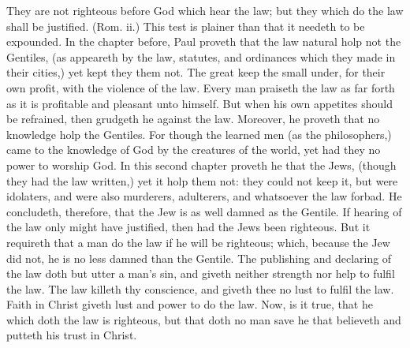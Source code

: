 They are not righteous before God which hear the
law; but they which do the law shall be justified. (Rom. ii.)
This test is plainer than that it needeth to be expounded.
In the chapter before, Paul proveth that the law natural holp 
not the Gentiles, (as appeareth by the law, statutes, and 
ordinances which they made in their cities,) yet kept they 
them not. The great keep the small under, for their own
profit, with the violence of the law. Every man praiseth
the law as far forth as it is profitable and pleasant unto 
himself. But when his own appetites should be refrained,
then grudgeth he against the law. Moreover, he 
proveth that no knowledge holp the Gentiles. For though 
the learned men (as the philosophers,) came to the knowledge
of God by the creatures of the world, yet had they 
no power to worship God. In this second chapter proveth 
he that the Jews, (though they had the law written,) yet it 
holp them not: they could not keep it, but were idolaters, 
and were also murderers, adulterers, and whatsoever the 
law forbad. He concludeth, therefore, that the Jew is as 
well damned as the Gentile. If hearing of the law only 
might have justified, then had the Jews been righteous. 
But it requireth that a man do the law if he will be 
righteous; which, because the Jew did not, he is no less 
damned than the Gentile. The publishing and declaring 
of the law doth but utter a man's sin, and giveth neither 
strength nor help to fulfil the law. The law killeth thy 
conscience, and giveth thee no lust to fulfil the law. Faith 
in Christ giveth lust and power to do the law. Now, is it 
true, that he which doth the law is righteous, but that doth 
no man save he that believeth and putteth his trust in 
Christ. 


